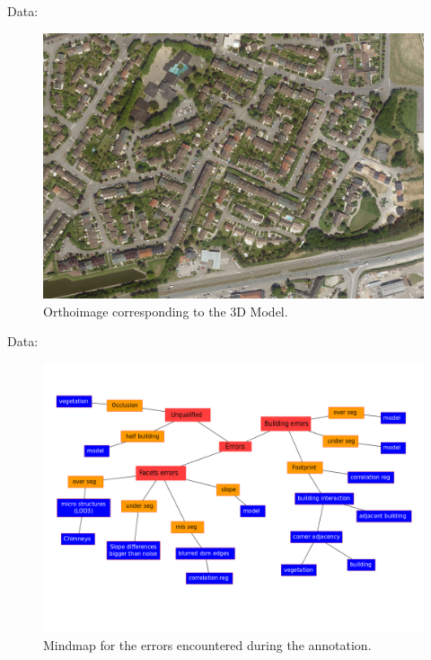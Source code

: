 \documentclass[9pt]{beamer}
\begin{document}
	\begin{frame}{Data:}
		\begin{figure}
			\begin{center}
				\caption{\label{img::ortho} Orthoimage corresponding to the 3D Model.}
				\includegraphics[scale=.08]{orthoimage.jpg}
			\end{center}
		\end{figure}
	\end{frame}
	
	\begin{frame}{Data:}
		\begin{figure}
			\begin{center}
				\caption{\label{img::mind_map} Mindmap for the errors encountered during the annotation.}
				\includegraphics[scale=.25]{heuristic.png}
			\end{center}
		\end{figure}
	\end{frame}
\end{document}
